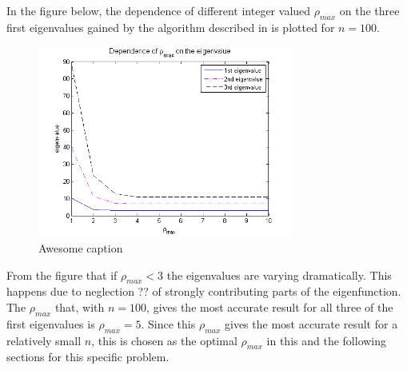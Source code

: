 In the figure below, the dependence of different integer valued $\rho_{max}$ on the three first eigenvalues gained by the algorithm described in  is plotted for $n=100$. 
\begin{figure}[H]
	\centering
	\includegraphics[width=0.75\textwidth]{Figures/rho_maxOnEigenvalue.png}
	\caption{Awesome caption}
	\label{fig:DependenceOnEigenvalue1}
\end{figure}
From the figure that if $\rho_{max} < 3$ the eigenvalues are varying dramatically.
This happens due to neglection ?? of strongly contributing parts of the eigenfunction. 
The $\rho_{max}$ that, with $n=100$, gives the most accurate result for all three of the first eigenvalues is $\rho_{max} = 5$. 
Since this $\rho_{max}$ gives the most accurate result for a relatively small $n$, this is chosen as the optimal $\rho_{max}$ in this and the following sections for this specific problem. 

